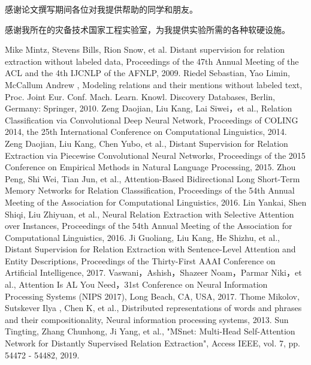 \documentclass[UTF8]{csoarticle}
\begin{document}
感谢论文撰写期间各位对我提供帮助的同学和朋友。

感谢我所在的灾备技术国家工程实验室，为我提供实验所需的各种软硬设施。

\begin{thebibliography}{10}
     Mike Mintz, Stevens Bills, Rion Snow, et al. Distant supervision for relation extraction without labeled data, Proceedings of the 47th Annual Meeting of the ACL and the 4th IJCNLP of the AFNLP, 2009.
     Riedel Sebastian, Yao Limin, McCallum Andrew , Modeling relations and their mentions without labeled text, Proc. Joint Eur. Conf. Mach. Learn. Knowl. Discovery Databases, Berlin, Germany: Springer, 2010.
     Zeng Daojian, Liu Kang, Lai Siwei，et al., Relation Classification via Convolutional Deep Neural Network, Proceedings of COLING 2014, the 25th International Conference on Computational Linguistics, 2014.
     Zeng Daojian, Liu Kang, Chen Yubo, et al., Distant Supervision for Relation Extraction via Piecewise Convolutional Neural Networks, Proceedings of the 2015 Conference on Empirical Methods in Natural Language Processing, 2015.
     Zhou Peng, Shi Wei, Tian Jun, et al.,  Attention-Based Bidirectional Long Short-Term Memory Networks for Relation Classsification, Proceedings of the 54th Annual Meeting of the Association for Computational Linguistics, 2016.
     Lin Yankai, Shen Shiqi, Liu Zhiyuan, et al., Neural Relation Extraction with Selective Attention over Instances, Proceedings of the 54th Annual Meeting of the Association for Computational Linguistics, 2016.
     Ji Guoliang, Liu Kang, He Shizhu, et al., Distant Supervision for Relation Extraction with Sentence-Level Attention and Entity Descriptions, Proceedings of the Thirty-First AAAI Conference on Artificial Intelligence, 2017.
     Vaswani，Ashish，Shazeer Noam，Parmar Niki，et al., Attention Is AL You Need，31st Conference on Neural Information Processing Systems (NIPS 2017), Long Beach, CA, USA, 2017.
     Thome Mikolov, Sutskever Ilya , Chen K, et al., Distributed representations of words and phrases and their compositionality, Neural information processing systems, 2013.
     Sun Tingting, Zhang Chunhong, Ji Yang, et al., "MSnet: Multi-Head Self-Attention Network for Distantly Supervised Relation Extraction", Access IEEE, vol. 7, pp. 54472 - 54482, 2019.
    
\end{thebibliography}
\end{document}

